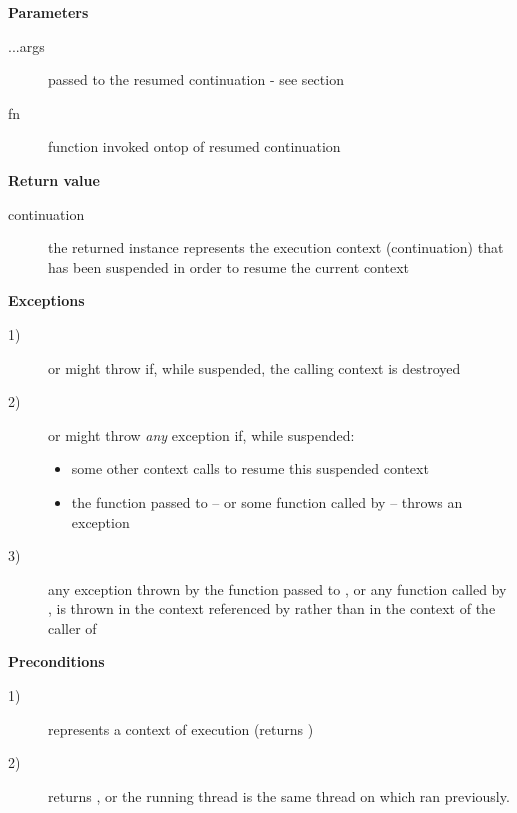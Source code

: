 {\bfseries Parameters}
\begin{description}
    \item[...args] passed to the resumed continuation - see section
    \item[fn] function invoked ontop of resumed continuation\\
\end{description}

{\bfseries Return value}
\begin{description}
    \item[continuation] the returned instance represents the execution context
                        (continuation) that has been suspended in order to
                        resume the current context
\end{description}

{\bfseries Exceptions}
\begin{description}
    \item[1)] \resume or \resumewith might
              throw \unwindex if, while suspended, the
              calling context is destroyed
    \item[2)] \resume or \resumewith might throw \emph{any}
              exception if, while suspended:
        \begin{itemize}
            \item some other context calls \resumewith to resume
              this suspended context
            \item the function  passed to \resumewith --
              or some function called by  -- throws an exception
        \end{itemize}
    \item[3)] any exception thrown by the function  passed
              to \resumewith, or any function called by , is thrown in
              the context referenced by  rather than in the context
              of the caller of \resumewith
\end{description}

{\bfseries Preconditions}
\begin{description}
    \item[1)]  represents a context of execution (\opbool returns
               )
    \item[2)]  returns , or the running thread is
              the same thread on which  ran previously.
\end{description}

